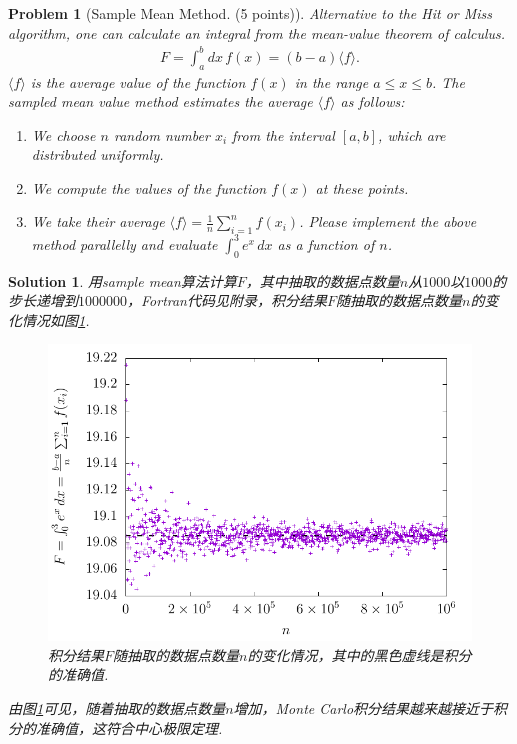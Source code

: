 \documentclass[UTF8,10pt,a4paper]{article}
\theoremstyle{Problem}
\newtheorem{prob}{Problem}
\theoremstyle{Solution}
\newtheorem*{sol}{Solution}
\begin{document}
\thispagestyle{FirstPageStyle}
\begin{prob}[Sample Mean Method. (5 points)] Alternative to the \textit{Hit or Miss} algorithm, one can calculate an integral from the mean-value theorem of calculus.
    \begin{align}
        F=\int_a^bdx\,f(x)=(b-a)\langle f\rangle.
    \end{align}
    $\langle f\rangle$ is the average value of the function $f(x)$ in the range $a\leq x\leq b$. The sampled mean value method estimates the average $\langle f\rangle$ as follows:
    \begin{enumerate}
        \item[(a)] We choose $n$ random number $x_i$ from the interval $[a,b]$, which are distributed uniformly.
        \item[(b)] We compute the values of the function $f(x)$ at these points.
        \item[(c)] We take their average $\langle f\rangle=\frac{1}{n}\sum_{i=1}^nf(x_i)$. Please implement the above method parallelly and evaluate $\int_0^3e^x\,dx$ as a function of $n$.
    \end{enumerate}
\end{prob}
\begin{sol}
    用sample mean算法计算$F$，其中抽取的数据点数量$n$从$1000$以$1000$的步长递增到$1000000$，Fortran代码见附录，积分结果$F$随抽取的数据点数量$n$的变化情况如图\ref{1-F-n}.
    \begin{figure}[h]
        \centering
        \includegraphics[width=.8\textwidth]{1-I-n.pdf}
        \caption{积分结果$F$随抽取的数据点数量$n$的变化情况，其中的黑色虚线是积分的准确值.}
        \label{1-F-n}
    \end{figure}

    由图\ref{1-F-n}可见，随着抽取的数据点数量$n$增加，Monte Carlo积分结果越来越接近于积分的准确值，这符合中心极限定理.
\end{sol}
\end{document}

